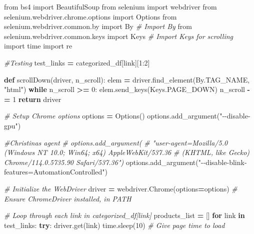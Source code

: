 \documentclass[
]{article}
\newenvironment{Shaded}{\begin{snugshade}}{\end{snugshade}}
\newcommand{\CommentTok}[1]{\textcolor[rgb]{0.56,0.35,0.01}{\textit{#1}}}
\newcommand{\ControlFlowTok}[1]{\textcolor[rgb]{0.13,0.29,0.53}{\textbf{#1}}}
\newcommand{\DecValTok}[1]{\textcolor[rgb]{0.00,0.00,0.81}{#1}}
\newcommand{\ImportTok}[1]{#1}
\newcommand{\KeywordTok}[1]{\textcolor[rgb]{0.13,0.29,0.53}{\textbf{#1}}}
\newcommand{\NormalTok}[1]{#1}
\newcommand{\OperatorTok}[1]{\textcolor[rgb]{0.81,0.36,0.00}{\textbf{#1}}}
\newcommand{\StringTok}[1]{\textcolor[rgb]{0.31,0.60,0.02}{#1}}
\begin{document}
\begin{Shaded}
\begin{Highlighting}[]
\ImportTok{from}\NormalTok{ bs4 }\ImportTok{import}\NormalTok{ BeautifulSoup}
\ImportTok{from}\NormalTok{ selenium }\ImportTok{import}\NormalTok{ webdriver}
\ImportTok{from}\NormalTok{ selenium.webdriver.chrome.options }\ImportTok{import}\NormalTok{ Options}
\ImportTok{from}\NormalTok{ selenium.webdriver.common.by }\ImportTok{import}\NormalTok{ By  }\CommentTok{\# Import By }
\ImportTok{from}\NormalTok{ selenium.webdriver.common.keys }\ImportTok{import}\NormalTok{ Keys  }\CommentTok{\# Import Keys for scrolling}
\ImportTok{import}\NormalTok{ time}
\ImportTok{import}\NormalTok{ re}

\CommentTok{\#Testing}
\NormalTok{test\_links }\OperatorTok{=}\NormalTok{ categorized\_df[}\StringTok{\textquotesingle{}link\textquotesingle{}}\NormalTok{][}\DecValTok{1}\NormalTok{:}\DecValTok{2}\NormalTok{]}

\KeywordTok{def}\NormalTok{ scrollDown(driver, n\_scroll):}
\NormalTok{    elem }\OperatorTok{=}\NormalTok{ driver.find\_element(By.TAG\_NAME, }\StringTok{"html"}\NormalTok{)}
    \ControlFlowTok{while}\NormalTok{ n\_scroll }\OperatorTok{\textgreater{}=} \DecValTok{0}\NormalTok{:}
\NormalTok{        elem.send\_keys(Keys.PAGE\_DOWN)}
\NormalTok{        n\_scroll }\OperatorTok{{-}=} \DecValTok{1}
    \ControlFlowTok{return}\NormalTok{ driver}

\CommentTok{\# Setup Chrome options}
\NormalTok{options }\OperatorTok{=}\NormalTok{ Options()}
\NormalTok{options.add\_argument(}\StringTok{"{-}{-}disable{-}gpu"}\NormalTok{)}

\CommentTok{\#Christina\textquotesingle{}s agent }
\CommentTok{\# options.add\_argument(}
\CommentTok{\#   "user{-}agent=Mozilla/5.0 (Windows NT 10.0; Win64; x64) AppleWebKit/537.36}
\CommentTok{\# (KHTML, like Gecko) Chrome/114.0.5735.90 Safari/537.36") }
\NormalTok{options.add\_argument(}\StringTok{"{-}{-}disable{-}blink{-}features=AutomationControlled"}\NormalTok{)}

\CommentTok{\# Initialize the WebDriver}
\NormalTok{driver }\OperatorTok{=}\NormalTok{ webdriver.Chrome(options}\OperatorTok{=}\NormalTok{options)  }\CommentTok{\# Ensure ChromeDriver installed, in PATH}

\CommentTok{\# Loop through each link in categorized\_df[\textquotesingle{}link\textquotesingle{}]}
\NormalTok{products\_list }\OperatorTok{=}\NormalTok{ []}
\ControlFlowTok{for}\NormalTok{ link }\KeywordTok{in}\NormalTok{ test\_links:}
    \ControlFlowTok{try}\NormalTok{:}
\NormalTok{        driver.get(link)}
\NormalTok{        time.sleep(}\DecValTok{10}\NormalTok{)  }\CommentTok{\# Give page time to load}
        

\end{Highlighting}
\end{Shaded}
\end{document}

